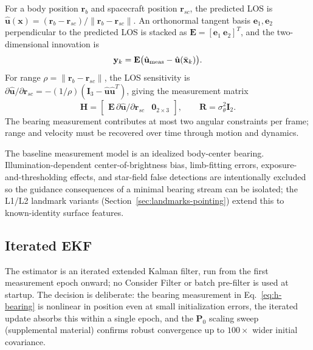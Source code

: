 \documentclass[10pt,twocolumn]{article}
\newcommand{\vect}[1]{\mathbf{#1}}
\newcommand{\mat}[1]{\mathbf{#1}}
\newcommand{\unit}[1]{\hat{\mathbf{#1}}}
\begin{document}
For a body position $\vect{r}_b$ and spacecraft position $\vect{r}_{sc}$, the predicted LOS is $\unit{u}(\vect{x})=(\vect{r}_b-\vect{r}_{sc})/\lVert\vect{r}_b-\vect{r}_{sc}\rVert$.  An orthonormal tangent basis $\vect{e}_1,\vect{e}_2$ perpendicular to the predicted LOS is stacked as $\mat{E}=[\vect{e}_1\ \vect{e}_2]^T$, and the two-dimensional innovation is
\begin{equation}
\vect{y}_k = \mat{E}\bigl(\unit{u}_{\rm meas}-\unit{u}(\bar{\vect{x}}_k)\bigr).
\label{eq:resid}
\end{equation}
For range $\rho=\lVert\vect{r}_b-\vect{r}_{sc}\rVert$, the LOS sensitivity is $\partial\unit{u}/\partial\vect{r}_{sc}=-(1/\rho)(\mat{I}_3-\unit{u}\unit{u}^T)$, giving the measurement matrix
\begin{equation}
\mat{H}=
\begin{bmatrix}
\mat{E}\,\partial\unit{u}/\partial\vect{r}_{sc} & \mat{0}_{2\times3}
\end{bmatrix},
\qquad
\mat{R}=\sigma_\theta^2\mat{I}_2.
\label{eq:h-bearing}
\end{equation}
The bearing measurement contributes at most two angular constraints per frame; range and velocity must be recovered over time through motion and dynamics.

The baseline measurement model is an idealized body-center bearing.  Illumination-dependent center-of-brightness bias, limb-fitting errors, exposure-and-thresholding effects, and star-field false detections are intentionally excluded so the guidance consequences of a minimal bearing stream can be isolated; the L1/L2 landmark variants (Section~\ref{sec:landmarks-pointing}) extend this to known-identity surface features.

\subsection{Iterated EKF}
\label{sec:iekf}
The estimator is an iterated extended Kalman filter, run from the first measurement epoch onward; no Consider Filter or batch pre-filter is used at startup.  The decision is deliberate: the bearing measurement in Eq.~\eqref{eq:h-bearing} is nonlinear in position even at small initialization errors, the iterated update absorbs this within a single epoch, and the $\vect{P}_0$ scaling sweep (supplemental material) confirms robust convergence up to $100\times$ wider initial covariance.
\end{document}

